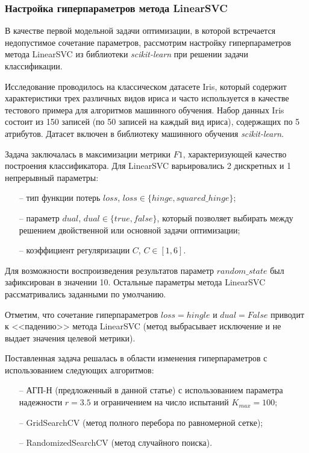 \documentclass[a4paper,12pt,russian]{article}
\begin{document}
\subsubsection{Настройка гиперпараметров метода LinearSVC}

В качестве первой модельной задачи оптимизации, в которой встречается недопустимое сочетание параметров, рассмотрим настройку гиперпараметров метода LinearSVC из библиотеки \textit{scikit-learn} при решении задачи классификации. 

Исследование проводилось на классическом датасете Iris, который содержит характеристики трех различных видов ириса и часто используется в качестве тестового примера для алгоритмов машинного обучения. Набор данных Iris состоит из 150 записей (по 50 записей на каждый вид ириса), содержащих по 5 атрибутов. Датасет включен в библиотеку машинного обучения \textit{scikit-learn}.

Задача заключалась в максимизации метрики $F1$, характеризующей качество построения классификатора. Для LinearSVC варьировались 2 дискретных и 1 непрерывный параметры:
\begin{itemize}
\item[--] тип функции потерь $loss$, $loss \in \{hinge, squared\_hinge\}$;
\item[--] параметр $dual$, $dual \in \{true, false\}$, который позволяет выбирать между решением двойственной или основной задачи оптимизации;
\item[--] коэффициент регуляризации $C$, $C \in [1,6]$.
\end{itemize}
Для возможности воспроизведения результатов параметр $random\_state$ был зафиксирован в значении 10. Остальные параметры метода LinearSVC рассматривались заданными по умолчанию.

Отметим, что сочетание гиперпараметров $loss = hingle$ и $dual = False$ приводит к <<падению>> метода LinearSVC (метод выбрасывает исключение и не выдает значения целевой метрики).

Поставленная задача решалась в области изменения гиперпараметров с использованием следующих алгоритмов:
\begin{itemize}
\item[--] АГП-Н (предложенный в данной статье) с использованием параметра надежности $r=3.5$ и ограничением на число испытаний $K_{max}=100$;
\item[--] GridSearchCV (метод полного перебора по равномерной сетке);
\item[--] RandomizedSearchCV (метод случайного поиска).
\end{itemize}
 
\end{document}
